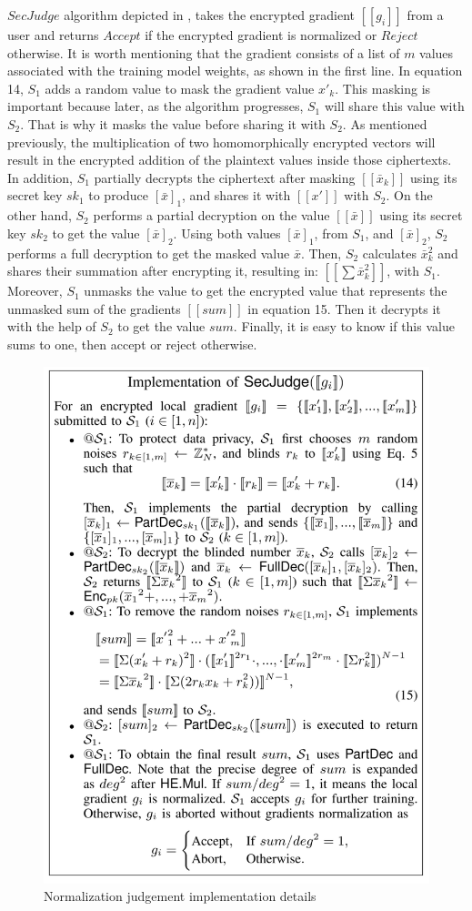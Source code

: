 \begin{appendices}
$SecJudge$ algorithm depicted in , takes the encrypted gradient $[[g_i]]$ from a user and returns $Accept$ if the encrypted gradient is normalized or $Reject$ otherwise.
It is worth mentioning that the gradient consists of a list of $m$ values associated with the training model weights, as shown in the first line.
In equation 14, $S_1$ adds a random value to mask the gradient value $x'_k$.
This masking is important because later, as the algorithm progresses, $S_1$ will share this value with $S_2$.
That is why it masks the value before sharing it with $S_2$.
As mentioned previously, the multiplication of two homomorphically encrypted vectors will result in the encrypted addition of the plaintext values inside those ciphertexts.
In addition, $S_1$ partially decrypts the ciphertext after masking $[[\bar{x}_k]]$ using its secret key $sk_1$ to produce $[\bar{x}]_1$, and shares it with $[[x']]$ with $S_2$.
On the other hand, $S_2$ performs a partial decryption on the value $[[\bar{x}]]$ using its secret key $sk_2$ to get the value $[\bar{x}]_2$.
Using both values $[\bar{x}]_1$, from $S_1$, and $[\bar{x}]_2$, $S_2$ performs a full decryption to get the masked value $\bar{x}$.
Then, $S_2$ calculates $\bar{x}_k^2$ and shares their summation after encrypting it, resulting in: $[[\sum \bar{x}_k^2]]$, with $S_1$.
Moreover, $S_1$ unmasks the value to get the encrypted value that represents the unmasked sum of the gradients $[[sum]]$ in equation 15.
Then it decrypts it with the help of $S_2$ to get the value $sum$.
Finally, it is easy to know if this value sums to one, then accept or reject otherwise.

\begin{figure}[htb]
\centering
  \includegraphics[width=0.8\linewidth]{resources/sec-judge-impl.pdf}
  \caption{Normalization judgement implementation details}
  \label{fig:sec-judge-impl}
\end{figure}


\end{appendices}
